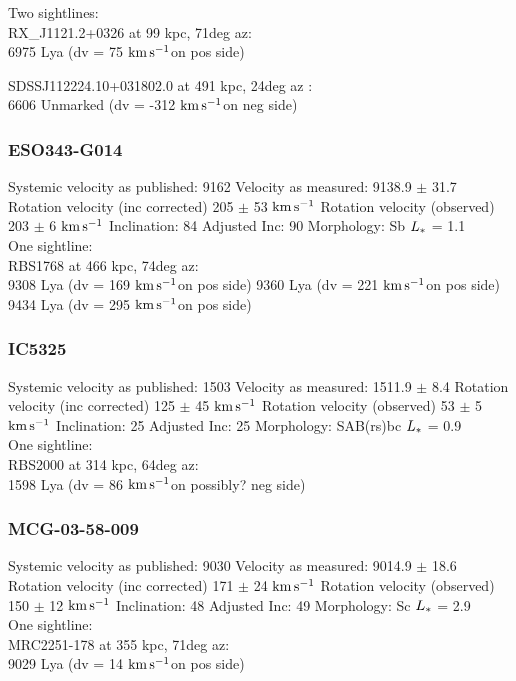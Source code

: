 \documentclass[iop]{emulateapj-rtx4}
\newcommand{\kms}{$\rm km\, s^{-1}$}
\begin{document}
Two sightlines: \\
RX\_J1121.2+0326 at 99 kpc, 71deg az: \\
6975 Lya (dv = 75 \kms on pos side)

SDSSJ112224.10+031802.0 at 491 kpc, 24deg az : \\
6606 Unmarked (dv = -312 \kms on neg side)



\subsubsection{ESO343-G014}
Systemic velocity as published: 9162
Velocity as measured: 9138.9 $\pm$ 31.7
Rotation velocity (inc corrected) 205 $\pm$ 53 \kms
Rotation velocity (observed) 203 $\pm$ 6 \kms
Inclination: 84
Adjusted Inc: 90
Morphology: Sb
$L_{\**}$ = 1.1 \\

One sightline: \\
RBS1768 at 466 kpc, 74deg az: \\
9308 Lya (dv = 169 \kms on pos side)
9360 Lya (dv = 221 \kms on pos side)
9434 Lya (dv = 295 \kms on pos side)


\subsubsection{IC5325}
Systemic velocity as published: 1503
Velocity as measured: 1511.9 $\pm$ 8.4
Rotation velocity (inc corrected) 125 $\pm$ 45 \kms
Rotation velocity (observed) 53 $\pm$ 5 \kms
Inclination: 25
Adjusted Inc: 25
Morphology: SAB(rs)bc
$L_{\**}$ = 0.9 \\

One sightline: \\
RBS2000 at 314 kpc, 64deg az: \\
1598 Lya (dv = 86 \kms on possibly? neg side)


\subsubsection{MCG-03-58-009}
Systemic velocity as published: 9030
Velocity as measured: 9014.9 $\pm$ 18.6
Rotation velocity (inc corrected) 171 $\pm$ 24 \kms
Rotation velocity (observed) 150 $\pm$ 12 \kms
Inclination: 48
Adjusted Inc: 49
Morphology: Sc
$L_{\**}$ = 2.9 \\

One sightline: \\
MRC2251-178 at 355 kpc, 71deg az: \\
9029 Lya (dv = 14 \kms on pos side)
\end{document}
